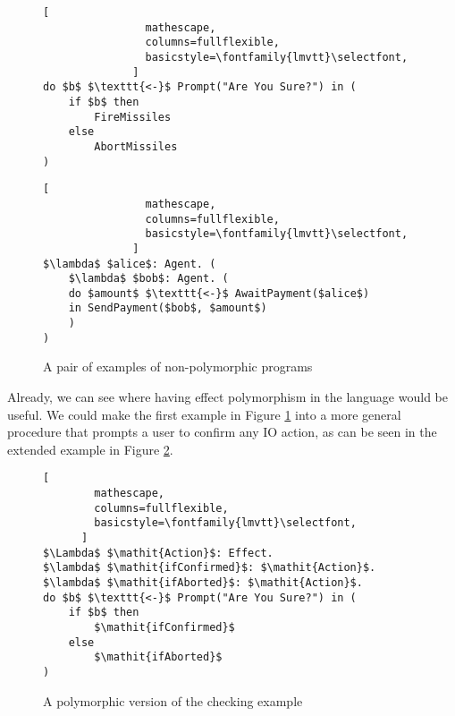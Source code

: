 \documentclass{Report}
\begin{document}
\begin{figure}
    \centering
    \begin{minipage}{0.45\textwidth}
        \begin{framed}
            \begin{lstlisting}[
                mathescape,
                columns=fullflexible,
                basicstyle=\fontfamily{lmvtt}\selectfont,
              ]
do $b$ $\texttt{<-}$ Prompt("Are You Sure?") in (
    if $b$ then
        FireMissiles
    else
        AbortMissiles
)
            \end{lstlisting}        
        \end{framed}
    \end{minipage}
    \quad
    \begin{minipage}{0.45\textwidth}
        \begin{framed}
            \begin{lstlisting}[
                mathescape,
                columns=fullflexible,
                basicstyle=\fontfamily{lmvtt}\selectfont,
              ]
$\lambda$ $alice$: Agent. (
    $\lambda$ $bob$: Agent. (
    do $amount$ $\texttt{<-}$ AwaitPayment($alice$)
    in SendPayment($bob$, $amount$)
    )
)
              \end{lstlisting}
        \end{framed}
    \end{minipage}
    \caption{A pair of examples of non-polymorphic programs}
    \label{CheckExample}
\end{figure}



Already, we can see where having effect polymorphism in the language would be useful. We could make the first example in Figure \ref{CheckExample} into a more general procedure that prompts a user to confirm any IO action, as can be seen in the extended example in Figure \ref{PolymorphicCheckExample}.

\begin{figure}
\begin{framed}
    \begin{lstlisting}[
        mathescape,
        columns=fullflexible,
        basicstyle=\fontfamily{lmvtt}\selectfont,
      ]
$\Lambda$ $\mathit{Action}$: Effect. 
$\lambda$ $\mathit{ifConfirmed}$: $\mathit{Action}$.
$\lambda$ $\mathit{ifAborted}$: $\mathit{Action}$.
do $b$ $\texttt{<-}$ Prompt("Are You Sure?") in (
    if $b$ then 
        $\mathit{ifConfirmed}$ 
    else
        $\mathit{ifAborted}$
)
    \end{lstlisting}        
\end{framed}
\caption{A polymorphic version of the checking example}
\label{PolymorphicCheckExample}
\end{figure}
\end{document}
